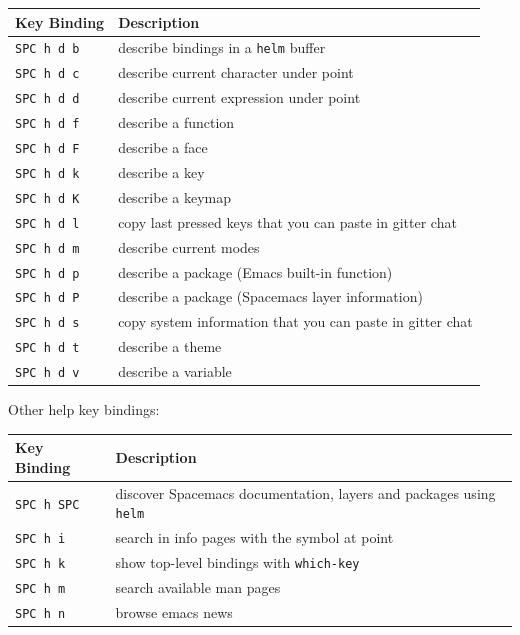 \documentclass[11pt]{article}
\begin{document}
\begin{center}
\begin{tabular}{ll}
Key Binding & Description\\
\hline
\texttt{SPC h d b} & describe bindings in a \texttt{helm} buffer\\
\texttt{SPC h d c} & describe current character under point\\
\texttt{SPC h d d} & describe current expression under point\\
\texttt{SPC h d f} & describe a function\\
\texttt{SPC h d F} & describe a face\\
\texttt{SPC h d k} & describe a key\\
\texttt{SPC h d K} & describe a keymap\\
\texttt{SPC h d l} & copy last pressed keys that you can paste in gitter chat\\
\texttt{SPC h d m} & describe current modes\\
\texttt{SPC h d p} & describe a package (Emacs built-in function)\\
\texttt{SPC h d P} & describe a package (Spacemacs layer information)\\
\texttt{SPC h d s} & copy system information that you can paste in gitter chat\\
\texttt{SPC h d t} & describe a theme\\
\texttt{SPC h d v} & describe a variable\\
\end{tabular}
\end{center}

Other help key bindings:

\begin{center}
\begin{tabular}{ll}
Key Binding & Description\\
\hline
\texttt{SPC h SPC} & discover Spacemacs documentation, layers and packages using \texttt{helm}\\
\texttt{SPC h i} & search in info pages with the symbol at point\\
\texttt{SPC h k} & show top-level bindings with \texttt{which-key}\\
\texttt{SPC h m} & search available man pages\\
\texttt{SPC h n} & browse emacs news\\
\end{tabular}
\end{center}
\end{document}
